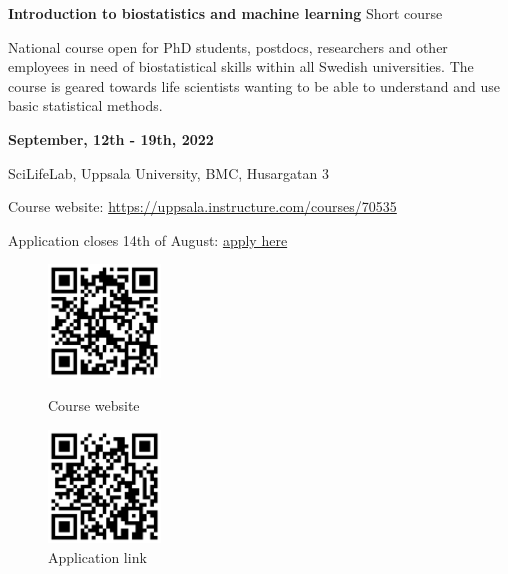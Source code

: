 \documentclass[12pt]{article}\usepackage[]{graphicx}\usepackage[]{color}
\begin{document}

\Huge
\textbf{Introduction to biostatistics and machine learning} %
\normalsize
Short course

National course open for PhD students, postdocs, researchers and other employees in need of biostatistical skills within all Swedish universities. The course is geared towards life scientists wanting to be able to understand and use basic statistical methods. 

\LARGE
\vspace{0.5cm}
\textbf{September, 12th - 19th, 2022} %

\normalsize
SciLifeLab, Uppsala University, BMC, Husargatan 3 %


\vspace{0.5cm}

\Large
\vspace{0.5cm}
Course website:
\href{https://uppsala.instructure.com/courses/70535}{https://uppsala.instructure.com/courses/70535}


\Large
Application closes 14th of August: \href{https://forms.gle/bZGvTiMyTzf2Hpx1A}{apply here}

\vspace{0.5cm}
\begin{figure}[H]
  \begin{minipage}[c]{0.4\linewidth}
  \includegraphics[width=3cm, height=3cm, center]{QR-code.png}
  \caption*{Course website}
  \end{minipage}\hfill
  \begin{minipage}[c]{0.4\linewidth}
  \includegraphics[width=3cm, height=3cm, center]{QR-application.png}
  \caption*{Application link}
  \end{minipage}
  
\end{figure}
\end{document}
